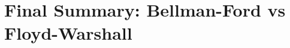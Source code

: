 \documentclass[14pt,a4paper]{extarticle}
\begin{document}


\newpage
\section{Final Summary: Bellman-Ford vs Floyd-Warshall}
\end{document}
